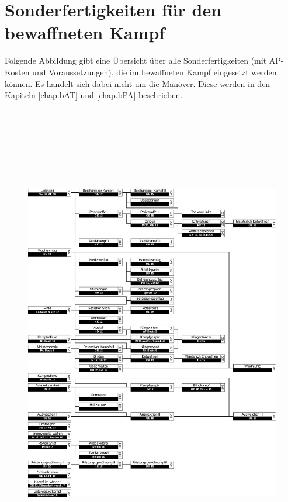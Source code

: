 %

\section{Sonderfertigkeiten für den bewaffneten Kampf}
Folgende Abbildung gibt eine Übersicht über alle Sonderfertigkeiten (mit AP-Kosten und Voraussetzungen), die im bewaffneten Kampf eingesetzt werden können.
Es handelt sich dabei nicht um die Manöver.
Diese werden in den Kapiteln \ref{chap.bAT} und \ref{chap.bPA} beschrieben.

\begin{figure}
    \centering
    \includegraphics[width=16.986cm,height=21.179cm]{fig/allSF.pdf}
\end{figure}

